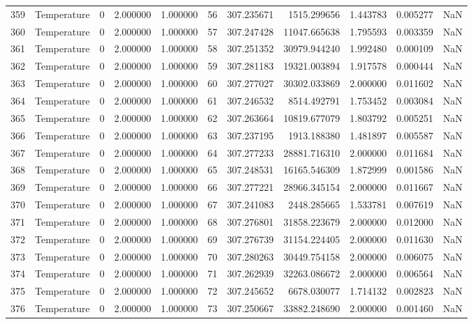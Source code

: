 \begin{tabular}{llrrrrrrrrr}
359 & Temperature & 0 & 2.000000 & 1.000000 & 56 & 307.235671 & 1515.299656 & 1.443783 & 0.005277 & NaN \\
360 & Temperature & 0 & 2.000000 & 1.000000 & 57 & 307.247428 & 11047.665638 & 1.795593 & 0.003359 & NaN \\
361 & Temperature & 0 & 2.000000 & 1.000000 & 58 & 307.251352 & 30979.944240 & 1.992480 & 0.000109 & NaN \\
362 & Temperature & 0 & 2.000000 & 1.000000 & 59 & 307.281183 & 19321.003894 & 1.917578 & 0.000444 & NaN \\
363 & Temperature & 0 & 2.000000 & 1.000000 & 60 & 307.277027 & 30302.033869 & 2.000000 & 0.011602 & NaN \\
364 & Temperature & 0 & 2.000000 & 1.000000 & 61 & 307.246532 & 8514.492791 & 1.753452 & 0.003084 & NaN \\
365 & Temperature & 0 & 2.000000 & 1.000000 & 62 & 307.263664 & 10819.677079 & 1.803792 & 0.005251 & NaN \\
366 & Temperature & 0 & 2.000000 & 1.000000 & 63 & 307.237195 & 1913.188380 & 1.481897 & 0.005587 & NaN \\
367 & Temperature & 0 & 2.000000 & 1.000000 & 64 & 307.277233 & 28881.716310 & 2.000000 & 0.011684 & NaN \\
368 & Temperature & 0 & 2.000000 & 1.000000 & 65 & 307.248531 & 16165.546309 & 1.872999 & 0.001586 & NaN \\
369 & Temperature & 0 & 2.000000 & 1.000000 & 66 & 307.277221 & 28966.345154 & 2.000000 & 0.011667 & NaN \\
370 & Temperature & 0 & 2.000000 & 1.000000 & 67 & 307.241083 & 2448.285665 & 1.533781 & 0.007619 & NaN \\
371 & Temperature & 0 & 2.000000 & 1.000000 & 68 & 307.276801 & 31858.223679 & 2.000000 & 0.012000 & NaN \\
372 & Temperature & 0 & 2.000000 & 1.000000 & 69 & 307.276739 & 31154.224405 & 2.000000 & 0.011630 & NaN \\
373 & Temperature & 0 & 2.000000 & 1.000000 & 70 & 307.280263 & 30449.754158 & 2.000000 & 0.006075 & NaN \\
374 & Temperature & 0 & 2.000000 & 1.000000 & 71 & 307.262939 & 32263.086672 & 2.000000 & 0.006564 & NaN \\
375 & Temperature & 0 & 2.000000 & 1.000000 & 72 & 307.245652 & 6678.030077 & 1.714132 & 0.002823 & NaN \\
376 & Temperature & 0 & 2.000000 & 1.000000 & 73 & 307.250667 & 33882.248690 & 2.000000 & 0.001460 & NaN \\

\end{tabular}
